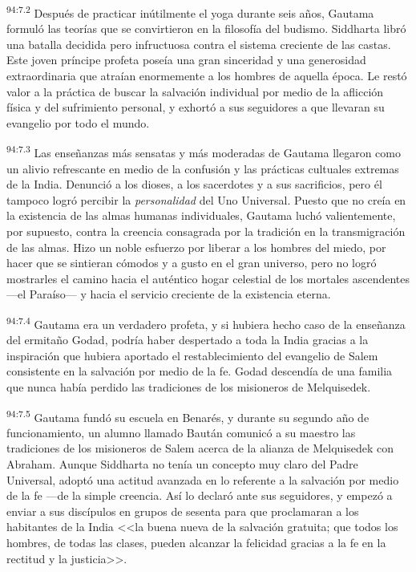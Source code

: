 \par
\textsuperscript{94:7.2} Después de practicar inútilmente el yoga durante seis años, Gautama formuló las teorías que se convirtieron en la filosofía del budismo. Siddharta libró una batalla decidida pero infructuosa contra el sistema creciente de las castas. Este joven príncipe profeta poseía una gran sinceridad y una generosidad extraordinaria que atraían enormemente a los hombres de aquella época. Le restó valor a la práctica de buscar la salvación individual por medio de la aflicción física y del sufrimiento personal, y exhortó a sus seguidores a que llevaran su evangelio por todo el mundo.

\par
\textsuperscript{94:7.3} Las enseñanzas más sensatas y más moderadas de Gautama llegaron como un alivio refrescante en medio de la confusión y las prácticas cultuales extremas de la India. Denunció a los dioses, a los sacerdotes y a sus sacrificios, pero él tampoco logró percibir la \textit{personalidad} del Uno Universal. Puesto que no creía en la existencia de las almas humanas individuales, Gautama luchó valientemente, por supuesto, contra la creencia consagrada por la tradición en la transmigración de las almas. Hizo un noble esfuerzo por liberar a los hombres del miedo, por hacer que se sintieran cómodos y a gusto en el gran universo, pero no logró mostrarles el camino hacia el auténtico hogar celestial de los mortales ascendentes ---el Paraíso--- y hacia el servicio creciente de la existencia eterna.

\par
\textsuperscript{94:7.4} Gautama era un verdadero profeta, y si hubiera hecho caso de la enseñanza del ermitaño Godad, podría haber despertado a toda la India gracias a la inspiración que hubiera aportado el restablecimiento del evangelio de Salem consistente en la salvación por medio de la fe. Godad descendía de una familia que nunca había perdido las tradiciones de los misioneros de Melquisedek.

\par
\textsuperscript{94:7.5} Gautama fundó su escuela en Benarés, y durante su segundo año de funcionamiento, un alumno llamado Baután comunicó a su maestro las tradiciones de los misioneros de Salem acerca de la alianza de Melquisedek con Abraham. Aunque Siddharta no tenía un concepto muy claro del Padre Universal, adoptó una actitud avanzada en lo referente a la salvación por medio de la fe ---de la simple creencia. Así lo declaró ante sus seguidores, y empezó a enviar a sus discípulos en grupos de sesenta para que proclamaran a los habitantes de la India <<la buena nueva de la salvación gratuita; que todos los hombres, de todas las clases, pueden alcanzar la felicidad gracias a la fe en la rectitud y la justicia>>.

